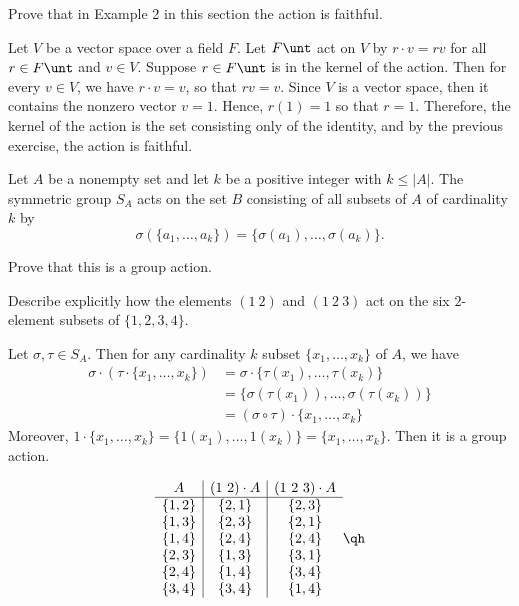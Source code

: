 \begin{exercise}\label{ex1.7.7}
    Prove that in Example 2 in this section the action is faithful.
\end{exercise}

\begin{sol}
    Let $V$ be a vector space over a field $F$. Let $F\unt$ act on $V$ by $r \cdot v = rv$ for all $r \in F\unt$ and $v \in V$. Suppose $r \in F\unt$ is in the kernel of the action. Then for every $v \in V$, we have $r \cdot v = v$, so that $rv = v$. Since $V$ is a vector space, then it contains the nonzero vector $v = 1$. Hence, $r(1) = 1$ so that $r = 1$. Therefore, the kernel of the action is the set consisting only of the identity, and by the previous exercise, the action is faithful.
\end{sol}

\begin{exercise}\label{ex1.7.8}
    Let $A$ be a nonempty set and let $k$ be a positive integer with $k\le |A|$. The symmetric group $S_A$ acts on the set $B$ consisting of all subsets of $A$ of cardinality $k$ by
    \[\sigma(\{a_1, \dots, a_k\}) = \{\sigma(a_1), \dots, \sigma(a_k)\}.\]
    \begin{subproblems}
        \item Prove that this is a group action.
        \item Describe explicitly how the elements $(1\ 2)$ and $(1\ 2\ 3)$ act on the six $2$-element subsets of $\{1,2,3,4\}$.
    \end{subproblems}
\end{exercise}

\begin{solalph}
    \item Let $\sigma, \tau \in S_A$. Then for any cardinality $k$ subset $\{x_1, \ldots, x_k\}$ of $A$, we have
    \begin{align*}
        \sigma \cdot (\tau \cdot \{x_1, \ldots, x_k\}) & = \sigma \cdot \{\tau(x_1), \ldots, \tau(x_k)\} \\
        & = \{\sigma(\tau(x_1)), \ldots, \sigma(\tau(x_k))\} \\
        & = (\sigma \circ \tau) \cdot \{x_1, \ldots, x_k\}
    \end{align*}
    Moreover, $1 \cdot \{x_1, \ldots, x_k\} = \{1(x_1), \ldots, 1(x_k)\} = \{x_1, \ldots, x_k\}$. Then it is a group action.
    \item
    \[
    \begin{array}{c|c|c}
        A & (1\ 2) \cdot A & (1\ 2\ 3) \cdot A \\
        \hline
        \{1, 2\} & \{2, 1\} & \{2, 3\} \\
        \{1, 3\} & \{2, 3\} & \{2, 1\} \\
        \{1, 4\} & \{2, 4\} & \{2, 4\} \\
        \{2, 3\} & \{1, 3\} & \{3, 1\} \\
        \{2, 4\} & \{1, 4\} & \{3, 4\} \\
        \{3, 4\} & \{3, 4\} & \{1, 4\}
    \end{array} \qh
    \]
\end{solalph}

